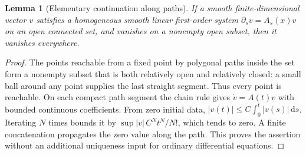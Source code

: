 \documentclass[11pt]{article}
\newcommand{\dd}{\mathrm d}
\newtheorem{lemma}[theorem]{Lemma}
\theoremstyle{remark}
\numberwithin{equation}{section}
\begin{document}
\begin{lemma}[Elementary continuation along paths]
If a smooth finite-dimensional vector $v$ satisfies a homogeneous smooth
linear first-order system $\partial_sv=A_s(x)v$ on an open connected
set, and vanishes on a nonempty open subset, then it vanishes everywhere.
\end{lemma}
\begin{proof}
The points reachable from a fixed point by polygonal paths inside the set
form a nonempty subset that is both relatively open and relatively closed:
a small ball around any point supplies the last straight segment. Thus
every point is reachable. On each compact path segment the chain rule
gives $\dot v=A(t)v$ with bounded continuous coefficients. From zero
initial data, $|v(t)|\le C\int_0^t|v(s)|\,\dd s$.
Iterating $N$ times bounds it by
$\sup|v|\,C^Nt^N/N!$, which tends to zero. A finite concatenation
propagates the zero value along the path. This proves the assertion
without an additional uniqueness input for ordinary differential equations.
\end{proof}
\end{document}
